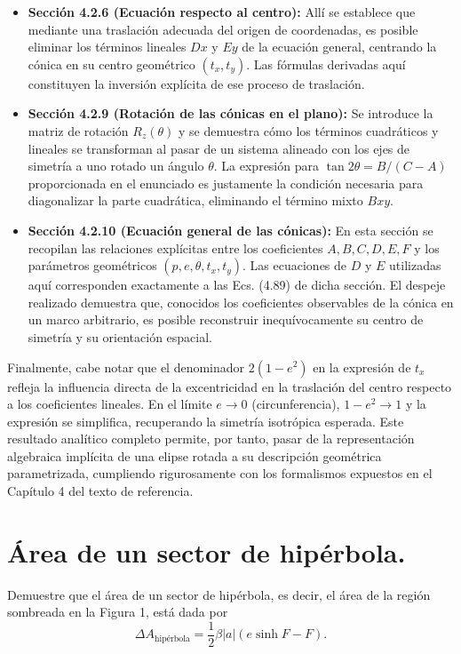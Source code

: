 \documentclass[12pt, a4paper]{article}
\begin{document}
\begin{itemize}
    \item \textbf{Sección 4.2.6 (Ecuación respecto al centro):} Allí se establece que mediante una traslación adecuada del origen de coordenadas, es posible eliminar los términos lineales $Dx$ y $Ey$ de la ecuación general, centrando la cónica en su centro geométrico $(t_x, t_y)$. Las fórmulas derivadas aquí constituyen la inversión explícita de ese proceso de traslación.
    
    \item \textbf{Sección 4.2.9 (Rotación de las cónicas en el plano):} Se introduce la matriz de rotación $R_z(\theta)$ y se demuestra cómo los términos cuadráticos y lineales se transforman al pasar de un sistema alineado con los ejes de simetría a uno rotado un ángulo $\theta$. La expresión para $\tan 2\theta = B/(C-A)$ proporcionada en el enunciado es justamente la condición necesaria para diagonalizar la parte cuadrática, eliminando el término mixto $Bxy$.
    
    \item \textbf{Sección 4.2.10 (Ecuación general de las cónicas):} En esta sección se recopilan las relaciones explícitas entre los coeficientes $A, B, C, D, E, F$ y los parámetros geométricos $(p, e, \theta, t_x, t_y)$. Las ecuaciones de $D$ y $E$ utilizadas aquí corresponden exactamente a las Ecs. (4.89) de dicha sección. El despeje realizado demuestra que, conocidos los coeficientes observables de la cónica en un marco arbitrario, es posible reconstruir inequívocamente su centro de simetría y su orientación espacial.
\end{itemize}

Finalmente, cabe notar que el denominador $2(1-e^2)$ en la expresión de $t_x$ refleja la influencia directa de la excentricidad en la traslación del centro respecto a los coeficientes lineales. En el límite $e \to 0$ (circunferencia), $1-e^2 \to 1$ y la expresión se simplifica, recuperando la simetría isotrópica esperada. Este resultado analítico completo permite, por tanto, pasar de la representación algebraica implícita de una elipse rotada a su descripción geométrica parametrizada, cumpliendo rigurosamente con los formalismos expuestos en el Capítulo 4 del texto de referencia.


\section{Área de un sector de hipérbola.} Demuestre que el área de un sector de hipérbola, es decir, el área de la región sombreada en la Figura 1, está dada por
$$\Delta A_{\text{hipérbola}} = \frac{1}{2} \beta |a| (e \sinh F - F).$$
\end{document}
